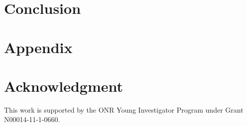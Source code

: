 \documentclass[10pt,twocolumn,twoside]{IEEEtran}
\begin{document}
\section{Conclusion}\label{sec:conclusion}


\section*{Appendix}


\section*{Acknowledgment}

This work is supported by the ONR Young Investigator Program under Grant N00014-11-1-0660.


\ifCLASSOPTIONcaptionsoff
  \newpage
\fi




%


\end{document}
